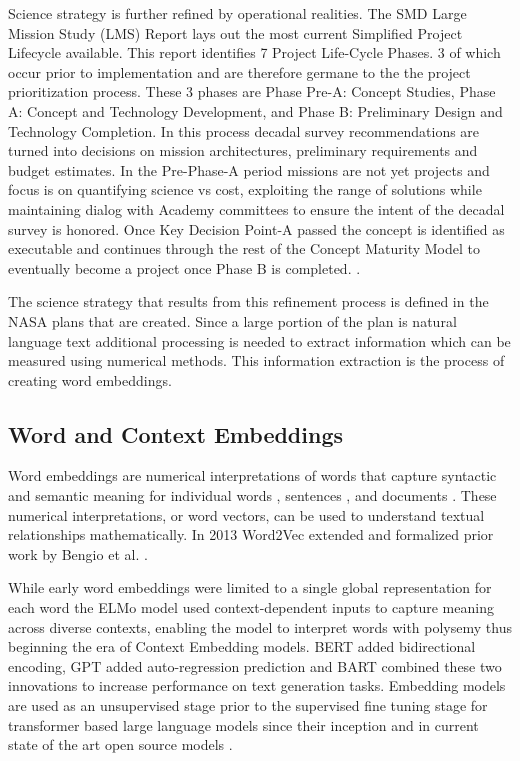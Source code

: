 \documentclass[preprint,12pt]{elsarticle}
\begin{document}
Science strategy is further refined by operational realities. The SMD Large Mission Study (LMS) Report lays out the most current Simplified Project Lifecycle available. This report identifies 7 Project Life-Cycle Phases. 3 of which occur prior to implementation and are therefore germane to the the project prioritization process. These 3 phases are Phase Pre-A: Concept Studies, Phase A: Concept and Technology Development, and Phase B: Preliminary Design and Technology Completion. In this process decadal survey recommendations are turned into decisions on mission architectures, preliminary requirements and budget estimates. In the Pre-Phase-A period missions are not yet projects and focus is on quantifying science vs cost, exploiting the range of solutions while maintaining dialog with Academy committees to ensure the intent of the decadal survey is honored. Once Key Decision Point-A passed the concept is identified as executable and continues through the rest of the Concept Maturity Model to eventually become a project once Phase B is completed. \cite{NASA2020_LMS_study} \cite{wessen2013ConceptMaturity}.

The science strategy that results from this refinement process is defined in the NASA plans that are created. Since a large portion of the plan is natural language text additional processing is needed to extract information which can be measured using numerical methods. This information extraction is the process of creating word embeddings.

\subsection{Word and Context Embeddings}
Word embeddings are numerical interpretations of words that capture syntactic and semantic meaning for individual words \cite{mikolov2013_reps_of_words}, sentences \cite{reimers2019sentencebertsentenceembeddingsusing}, and documents \cite{wu_2018_doc_embeds}. These numerical interpretations, or word vectors, can be used to understand textual relationships mathematically. In 2013 Word2Vec extended \cite{mikolov2013_reps_of_words} and formalized \cite{mikolov2013_efficient_word_est} prior work by Bengio et al. \cite{bengio_2003_neural_prob_lang}. 

While early word embeddings were limited to a single global representation for each word the ELMo model \cite{peters2018deepcontextualizedwordrepresentations} used context-dependent inputs to capture meaning across diverse contexts, enabling the model to interpret words with polysemy thus beginning the era of Context Embedding models. BERT \cite{devlin2019bert_pretraining} added bidirectional encoding, GPT \cite{radford2018improving_GPT} added auto-regression prediction and BART \cite{lewis2019bart} combined these two innovations to increase performance on text generation tasks. Embedding models are used as an unsupervised stage prior to the supervised fine tuning stage for transformer based large language models since their inception \cite{vaswani2023attentionneed} and in current state of the art open source models \cite{grattafiori2024_llama3_herdmodels}.
\end{document}
